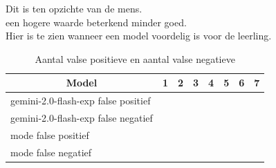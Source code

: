 \documentclass[12pt]{article}
\begin{document}
\noindent\begin{table}[H]
\caption{Aantal valse positieve en aantal valse negatieve}

\label{fig:false-pos-neg}

Dit is ten opzichte van de mens.\\
een hogere waarde beterkend minder goed. \\
Hier is te zien wanneer een model voordelig is voor de leerling.
\begin{tabularx}{\textwidth}{p{4cm} XXXXXXX}
    \toprule
    \multicolumn{1}{c}{\textbf{Model}} & \multicolumn{1}{c}{\textbf{1}} & \multicolumn{1}{c}{\textbf{2}} & \multicolumn{1}{c}{\textbf{3}} & \multicolumn{1}{c}{\textbf{4}} & \multicolumn{1}{c}{\textbf{5}} & \multicolumn{1}{c}{\textbf{6}} & \multicolumn{1}{c}{\textbf{7}} \\
    \midrule
    gemini-2.0-flash-exp false positief & \cellcolor[rgb]{1.000,1.000,1.000}{0} & \cellcolor[rgb]{0.909,0.939,0.909}{2} & \cellcolor[rgb]{0.592,0.726,0.592}{9} & \cellcolor[rgb]{0.909,0.939,0.909}{2} & \cellcolor[rgb]{0.909,0.939,0.909}{2} & \cellcolor[rgb]{1.000,1.000,1.000}{0} & \cellcolor[rgb]{1.000,1.000,1.000}{0} \\
    gemini-2.0-flash-exp false negatief & \cellcolor[rgb]{1.000,1.000,1.000}{0} & \cellcolor[rgb]{1.000,1.000,1.000}{0} & \cellcolor[rgb]{1.000,1.000,1.000}{0} & \cellcolor[rgb]{0.864,0.909,0.864}{3} & \cellcolor[rgb]{0.955,0.970,0.955}{1} & \cellcolor[rgb]{0.909,0.939,0.909}{2} & \cellcolor[rgb]{0.819,0.878,0.819}{4} \\
    mode false positief & \cellcolor[rgb]{1.000,1.000,1.000}{0} & \cellcolor[rgb]{1.000,1.000,1.000}{0} & \cellcolor[rgb]{0.909,0.939,0.909}{2} & \cellcolor[rgb]{0.909,0.939,0.909}{2} & \cellcolor[rgb]{0.909,0.939,0.909}{2} & \cellcolor[rgb]{1.000,1.000,1.000}{0} & \cellcolor[rgb]{0.909,0.939,0.909}{2} \\
    mode false negatief & \cellcolor[rgb]{0.955,0.970,0.955}{1} & \cellcolor[rgb]{1.000,1.000,1.000}{0} & \cellcolor[rgb]{1.000,1.000,1.000}{0} & \cellcolor[rgb]{0.728,0.818,0.728}{6} & \cellcolor[rgb]{0.909,0.939,0.909}{2} & \cellcolor[rgb]{0.864,0.909,0.864}{3} & \cellcolor[rgb]{0.819,0.878,0.819}{4} \\
    \bottomrule
\end{tabularx}
\end{table}

\pagebreak
\end{document}
